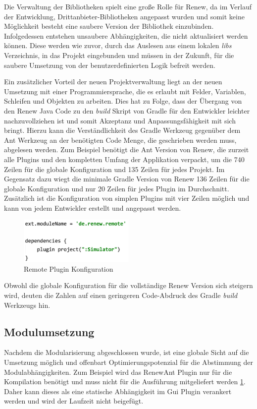 	Die Verwaltung der Bibliotheken spielt eine große Rolle für Renew, da im Verlauf der Entwicklung, Drittanbieter-Bibliotheken angepasst wurden und somit keine Möglichkeit besteht eine saubere Version der Bibliothek einzubinden. Infolgedessen entstehen  unsaubere Abhängigkeiten, die nicht aktualisiert werden können. Diese werden wie zuvor, durch das Auslesen aus einem lokalen \textit{libs} Verzeichnis, in das Projekt eingebunden und müssen in der Zukunft, für die saubere Umsetzung von der benutzerdefinierten Logik befreit werden.\bigbreak

	Ein zusätzlicher Vorteil der neuen Projektverwaltung liegt an der neuen Umsetzung mit einer Programmiersprache, die es erlaubt mit Felder, Variablen, Schleifen und Objekten zu arbeiten. Dies hat zu Folge, dass der Übergang von den Renew Java Code zu den \textit{build} Skript von Gradle für den Entwickler leichter nachzuvollziehen ist und somit Akzeptanz und Anpassungsfähigkeit mit sich bringt. \newline
	Hierzu kann die Verständlichkeit des Gradle Werkzeug gegenüber dem Ant Werkzeug an der benötigten Code Menge, die geschrieben werden muss, abgelesen werden. Zum Beispiel benötigt die Ant Version von Renew, die zurzeit alle Plugins und den kompletten Umfang der Applikation verpackt, um die 740 Zeilen für die globale Konfiguration und 135 Zeilen für jedes Projekt. Im Gegensatz dazu wiegt die minimale Gradle Version von Renew 136 Zeilen für die globale Konfiguration und nur 20 Zeilen für jedes Plugin im Durchschnitt. Zusätzlich ist die Konfiguration von simplen Plugins mit vier Zeilen möglich und kann von jedem Entwickler erstellt und angepasst werden.

	\begin{figure}[h!]
	  \centering
	  \includegraphics[width=0.5\textwidth]{material/images/Remote_config.png}
	  \caption{Remote Plugin Konfiguration}
	  \label{fig:remote_config}
	\end{figure}	

	Obwohl die globale Konfiguration für die vollständige Renew Version sich steigern wird, deuten die Zahlen auf einen geringeren Code-Abdruck des Gradle \textit{build} Werkzeugs hin.\bigbreak

\subsection{Modulumsetzung} \label{sub:optimierung}%
	Nachdem die Modularisierung abgeschlossen wurde, ist eine globale Sicht auf die Umsetzung möglich und offenbart Optimierungspotenzial für die Abstimmung der Modulabhängigkeiten. Zum Beispiel wird das RenewAnt Plugin nur für die Kompilation benötigt und muss nicht für die Ausführung mitgeliefert werden \ref{fig:remote_config}. Daher kann dieses als eine statische Abhängigkeit im Gui Plugin verankert werden und wird der Laufzeit nicht beigefügt.\bigbreak

